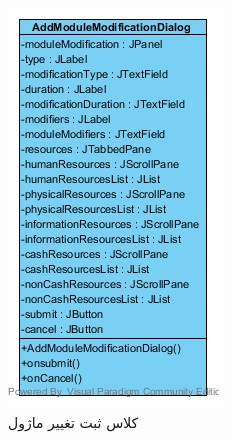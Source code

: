 \begin{figure}[H]
	\centering
	\begin{subfigure}[b]{0.4\textwidth}
	\includegraphics[width=\textwidth]{img/class-design/ui/AddModuleModificationDialog.jpg}
	\caption{کلاس ثبت تغییر ماژول}
	\end{subfigure}
	\begin{subfigure}[b]{0.4\textwidth}

\end{subfigure}
\end{figure}
